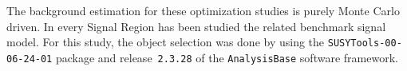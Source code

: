 %
%

The background estimation for these optimization studies is purely Monte Carlo driven. 
In every Signal Region has been studied the related benchmark signal model. For this study, the object selection was done by using the \texttt{SUSYTools-00-06-24-01} package 
and release~\texttt{2.3.28} of the \texttt{AnalysisBase} software framework.

